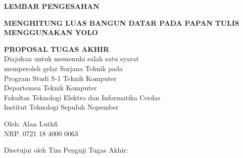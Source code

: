 \begin{center}
	\large
  \textbf{LEMBAR PENGESAHAN}
\end{center}

\thispagestyle{empty}

\begin{center}
  \textbf{  MENGHITUNG LUAS BANGUN DATAR PADA PAPAN TULIS MENGGUNAKAN YOLO}
\end{center}

\begingroup
  \small
  
  \vspace{3ex}

  \begin{center}
    \textbf{PROPOSAL TUGAS AKHIR}
    \\Diajukan untuk memenuhi salah satu syarat
    \\memperoleh gelar Sarjana Teknik pada
    \\Program Studi S-1 Teknik Komputer
    \\Departemen Teknik Komputer
    \\Fakultas Teknologi Elektro dan Informatika Cerdas
    \\Institut Teknologi Sepuluh Nopember
  \end{center}

  \vspace{3ex}

  \begin{center}
    Oleh: Alan Luthfi 
    \\NRP. 0721 18 4000 0063
  \end{center}

  \vspace{3ex}


  \begin{center}
    Disetujui oleh Tim Penguji Tugas Akhir:
  \end{center}

  \vspace{4ex}

  \begingroup
    \setlength{\tabcolsep}{0pt}

